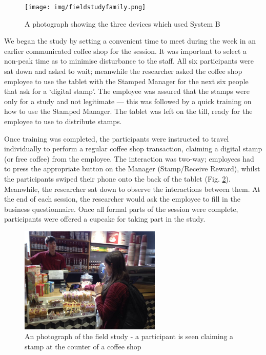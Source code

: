 \begin{figure}[H]
 \centering
  \texttt{[image: img/fieldstudyfamily.png]}
     \caption{A photograph showing the three devices which used System B}
     \label{fig:fieldstudyfamily}
\end{figure}

We began the study by setting a convenient time to meet during the week in an earlier communicated coffee shop for the session. It was important to select a non-peak time as to minimise disturbance to the staff. All six participants were sat down and asked to wait; meanwhile the researcher asked the coffee shop employee to use the tablet with the Stamped Manager for the next six people that ask for a `digital stamp'. The employee was assured that the stamps were only for a study and not legitimate --- this was followed by a quick training on how to use the Stamped Manager. The tablet was left on the till, ready for the employee to use to distribute stamps.

Once training was completed, the participants were instructed to travel individually to perform a regular coffee shop transaction, claiming a digital stamp (or free coffee) from the employee. The interaction was two-way; employees had to press the appropriate button on the Manager (Stamp/Receive Reward), whilst the participants swiped their phone onto the back of the tablet (Fig. \ref{fig:hollystamping}). Meanwhile, the researcher sat down to observe the interactions between them. At the end of each session, the researcher would ask the employee to fill in the business questionnaire. Once all formal parts of the session were complete, participants were offered a cupcake for taking part in the study.

\begin{figure}[H]
 \centering
  \includegraphics[width=0.6\textwidth]{img/hollystamping.jpg}
     \caption{An photograph of the field study - a participant is seen claiming a stamp at the counter of a coffee shop}
     \label{fig:hollystamping}
\end{figure}


